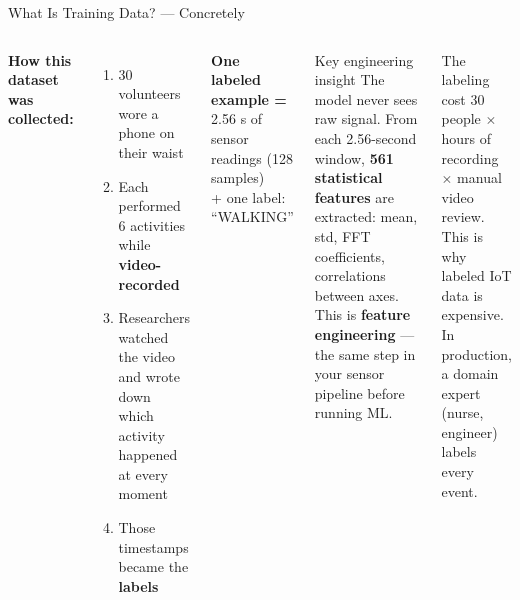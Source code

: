\documentclass[aspectratio=169,11pt]{beamer}
\begin{document}
\begin{frame}{What Is Training Data? --- Concretely}
    \begin{columns}
        \textbf{How this dataset was collected:}
        \begin{enumerate}
            \item 30 volunteers wore a phone on their waist
            \item Each performed 6 activities while \textbf{video-recorded}
            \item Researchers watched the video and wrote down which activity happened at every moment
            \item Those timestamps became the \textbf{labels}
        \end{enumerate}

        \vspace{0.2cm}
        \textbf{One labeled example =}\\
        \hspace{0.3cm} 2.56 s of sensor readings (128 samples)\\
        \hspace{0.3cm} + one label: ``WALKING''

        \begin{alertblock}{Key engineering insight}
            The model never sees raw signal. From each 2.56-second window, \textbf{561 statistical features} are extracted: mean, std, FFT coefficients, correlations between axes. This is \textbf{feature engineering} --- the same step in your sensor pipeline before running ML.
        \end{alertblock}

        \vspace{0.2cm}
        \begin{exampleblock}{The labeling cost}
            30 people $\times$ hours of recording $\times$ manual video review. This is why labeled IoT data is expensive. In production, a domain expert (nurse, engineer) labels every event.
        \end{exampleblock}
    \end{columns}
\end{frame}
\end{document}
